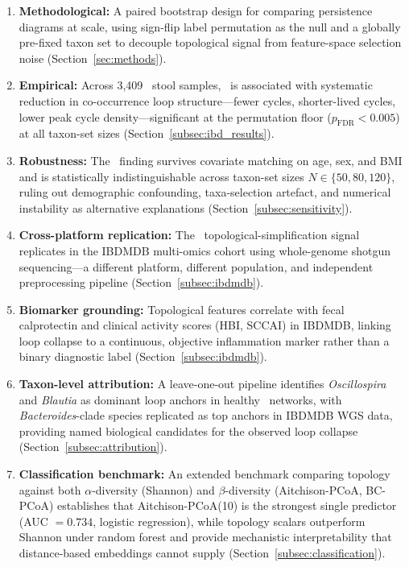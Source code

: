 \begin{enumerate}[leftmargin=*, itemsep=3pt]
  \item \textbf{Methodological:} A paired bootstrap design for comparing
  persistence diagrams at scale, using sign-flip label permutation as the null
  and a globally pre-fixed taxon set to decouple topological signal from
  feature-space selection noise (Section~\ref{sec:methods}).

  \item \textbf{Empirical:} Across 3,409 \agp\ stool samples, \ibd\ is
  associated with systematic reduction in co-occurrence loop structure---fewer
  cycles, shorter-lived cycles, lower peak cycle density---significant at the
  permutation floor ($p_{\text{FDR}} < 0.005$) at all taxon-set sizes
  (Section~\ref{subsec:ibd_results}).

  \item \textbf{Robustness:} The \ibd\ finding survives covariate matching
  on age, sex, and BMI and is statistically indistinguishable across taxon-set
  sizes $N \in \{50, 80, 120\}$, ruling out demographic confounding,
  taxa-selection artefact, and numerical instability as alternative
  explanations (Section~\ref{subsec:sensitivity}).

  \item \textbf{Cross-platform replication:} The \ibd\ topological-simplification
  signal replicates in the IBDMDB multi-omics cohort using whole-genome
  shotgun sequencing---a different platform, different population, and
  independent preprocessing pipeline (Section~\ref{subsec:ibdmdb}).

  \item \textbf{Biomarker grounding:} Topological features correlate with
  fecal calprotectin and clinical activity scores (HBI, SCCAI) in IBDMDB,
  linking loop collapse to a continuous, objective inflammation marker rather
  than a binary diagnostic label (Section~\ref{subsec:ibdmdb}).

  \item \textbf{Taxon-level attribution:} A leave-one-out pipeline identifies
  \textit{Oscillospira} and \textit{Blautia} as dominant loop anchors in
  healthy \agp\ networks, with \textit{Bacteroides}-clade species replicated
  as top anchors in IBDMDB WGS data, providing named biological candidates for
  the observed loop collapse (Section~\ref{subsec:attribution}).

  \item \textbf{Classification benchmark:} An extended benchmark comparing
  topology against both $\alpha$-diversity (Shannon) and $\beta$-diversity
  (Aitchison-PCoA, BC-PCoA) establishes that Aitchison-PCoA(10) is the
  strongest single predictor (AUC $= 0.734$, logistic regression), while
  topology scalars outperform Shannon under random forest and provide
  mechanistic interpretability that distance-based embeddings cannot supply
  (Section~\ref{subsec:classification}).


\end{enumerate}
